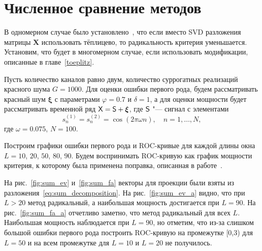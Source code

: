 \documentclass[specialist,
substylefile = spbu_report.rtx,
subf,href,colorlinks=true, 12pt]{disser}
\newcommand{\traj}{\mathbf{X}}
\theoremstyle{definition}
\newcommand{\bfxi}{\boldsymbol{\xi}}
\begin{document}
\section{Численное сравнение методов}\label{mc-ssa_numeric_comparison}
В одномерном случае было установлено~\cite{Larin_2022}, что если вместо SVD разложения матрицы $\traj$ использовать тёплицево, то радикальность критерия уменьшается. Установим, что будет в многомерном случае, если использовать модификации, описанные в главе~\ref{toeplitz}.

Пусть количество каналов равно двум, количество суррогатных реализаций красного шума $G=1000$. Для оценки ошибки первого рода, будем рассматривать красный шум $\bfxi$ с параметрами $\varphi=0.7$ и $\delta=1$, а для оценки мощности будет рассматривать временной ряд $\tX=\tS+\bfxi$, где $\mathsf{S}$ "--- сигнал с элементами
\[
	s_n^{(1)}=s_n^{(2)}=\cos(2\pi\omega n),\quad n=1,\ldots, N,
\]
где $\omega=0.075$, $N=100$.

Построим графики ошибки первого рода и ROC-кривые для каждой длины окна $L=10$, $20$, $50$, $80$, $90$. Будем воспринимать ROC-кривую как график мощности критерия, к которому была применена поправка, описанная в работе~\cite{Larin_2022}.

На рис.~\ref{fig:sum_ev} и~\ref{fig:sum_fa} векторы для проекции были взяты из разложения~\eqref{eq:sum_decomposition}. На рис.~\ref{fig:sum_ev_a} видно, что при $L>20$ метод радикальный, а наибольшая мощность достигается при $L=90$. На рис.~\ref{fig:sum_fa_a} отчетливо заметно, что метод радикальный для всех $L$. Наибольшая мощность наблюдается при $L=90$, но отметим, что из-за слишком большой ошибки первого рода построить ROC-кривую на промежутке [0,3) для $L=50$ и на всем промежутке для $L=10$ и $L=20$ не получилось.
\end{document}
